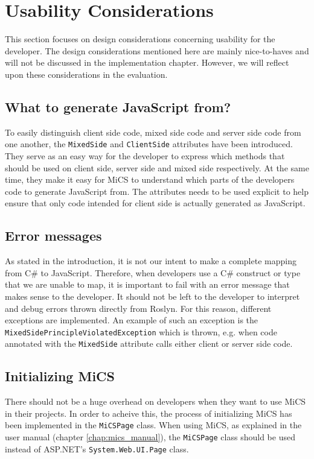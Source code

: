 \section{Usability Considerations}
This section focuses on design considerations concerning usability for the developer. The design considerations mentioned here are mainly nice-to-haves and will not be discussed in the implementation chapter. However, we will reflect upon these considerations in the evaluation.

\subsection{What to generate JavaScript from?} %
\label{sub:what_to_generate_javascript_from}
	To easily distinguish client side code, mixed side code and server side code from one another, the \texttt{MixedSide} and \texttt{ClientSide} attributes have been introduced. They serve as an easy way for the developer to express which methods that should be used on client side, server side and mixed side respectively. At the same time, they make it easy for MiCS to understand which parts of the developers code to generate JavaScript from. The attributes needs to be used explicit to help ensure that only code intended for client side is actually generated as JavaScript.


\subsection{Error messages} %
\label{sub:design_error_messages}
	As stated in the introduction, it is not our intent to make a complete mapping from C\# to JavaScript. Therefore, when developers use a C\# construct or type that we are unable to map, it is important to fail with an error message that makes sense to the developer. It should not be left to the developer to interpret and debug errors thrown directly from Roslyn. For this reason, different exceptions are implemented. An example of such an exception is the \texttt{MixedSidePrincipleViolatedException} which is thrown, e.g. when code annotated with the \texttt{MixedSide} attribute calls either client or server side code.


\subsection{Initializing MiCS} %
\label{sub:initializng_mics}
	There should not be a huge overhead on developers when they want to use MiCS in their projects. In order to acheive this, the process of initializing MiCS has been implemented in the \texttt{MiCSPage} class. When using MiCS, as explained in the user manual (chapter \ref{chap:mics_manual}), the \texttt{MiCSPage} class should be used instead of ASP.NET's \texttt{System.Web.UI.Page} class.
